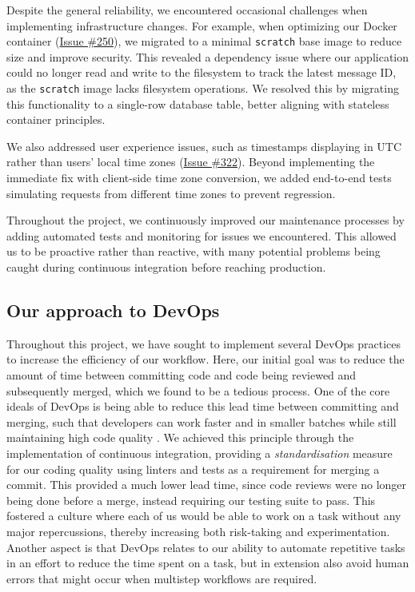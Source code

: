 Despite the general reliability, we encountered occasional challenges when implementing infrastructure changes. For example, when optimizing our Docker container (\href{https://github.com/devops-q/devops/issues/250}{Issue \#250}), we migrated to a minimal \texttt{scratch} base image to reduce size and improve security. This revealed a dependency issue where our application could no longer read and write to the filesystem to track the latest message ID, as the \texttt{scratch} image lacks filesystem operations. We resolved this by migrating this functionality to a single-row database table, better aligning with stateless container principles.

We also addressed user experience issues, such as timestamps displaying in UTC rather than users' local time zones (\href{https://github.com/devops-q/devops/issues/322}{Issue \#322}). Beyond implementing the immediate fix with client-side time zone conversion, we added end-to-end tests simulating requests from different time zones to prevent regression.

Throughout the project, we continuously improved our maintenance processes by adding automated tests and monitoring for issues we encountered. This allowed us to be proactive rather than reactive, with many potential problems being caught during continuous integration before reaching production.

\subsection{Our approach to DevOps} %
Throughout this project, we have sought to implement several DevOps practices to increase the efficiency of our workflow. Here, our initial goal was to reduce the amount of time between committing code and code being reviewed and subsequently merged, which we found to be a tedious process. One of the core ideals of DevOps is being able to reduce this lead time between committing and merging, such that developers can work faster and in smaller batches while still maintaining high code quality \parencite{handbook}. We achieved this principle through the implementation of continuous integration, providing a \textit{standardisation} measure for our coding quality using linters and tests as a requirement for merging a commit. This provided a much lower lead time, since code reviews were no longer being done before a merge, instead requiring our testing suite to pass. This fostered a culture where each of us would be able to work on a task without any major repercussions, thereby increasing both risk-taking and experimentation. Another aspect is that DevOps relates to our ability to automate repetitive tasks in an effort to reduce the time spent on a task, but in extension also avoid human errors that might occur when multistep workflows are required.  
